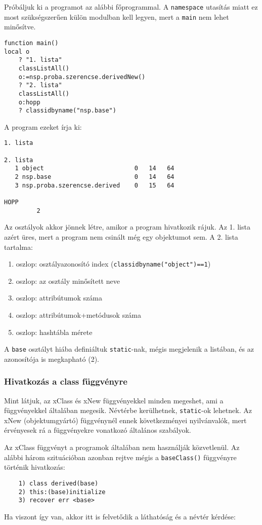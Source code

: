 Próbáljuk ki a programot az alábbi főprogrammal. A  \verb!namespace! 
utasítás miatt ez most szükségszerűen külön modulban kell legyen, mert a \verb!main!
nem lehet minősítve.
\begin{verbatim}
function main()
local o
    ? "1. lista"
    classListAll()
    o:=nsp.proba.szerencse.derivedNew()
    ? "2. lista"
    classListAll()
    o:hopp
    ? classidbyname("nsp.base")
\end{verbatim}
A program ezeket írja ki:
\begin{verbatim}
1. lista

2. lista
   1 object                         0   14   64
   2 nsp.base                       0   14   64
   3 nsp.proba.szerencse.derived    0   15   64

HOPP
         2
\end{verbatim}
Az osztályok akkor jönnek létre, amikor a program hivatkozik rájuk.
Az 1. lista azért üres, mert a program nem csinált még egy objektumot sem.
A 2. lista tartalma:
\begin{enumerate}
\item oszlop: osztályazonosító index (\verb!classidbyname("object")==1!)
\item oszlop: az osztály minősített neve
\item oszlop: attribútumok száma
\item oszlop: attribútumok+metódusok száma
\item oszlop: hashtábla mérete
\end{enumerate}
A \verb!base! osztályt hiába definiáltuk \verb!static!-nak, 
mégis megjelenik a listában, és az azonosítója is megkapható (2).


\subsubsection{Hivatkozás a class függvényre}

Mint látjuk, az xClass és xNew függvényekkel minden megeshet, 
ami a függvényekkel általában megesik. Névtérbe kerülhetnek, 
\verb!static!-ok lehetnek.
Az xNew (objektumgyártó) függvénynél ennek következményei
nyilvánvalók, mert érvényesek rá a függvényekre vonatkozó 
általános szabályok.

Az xClass függvényt a programok általában nem használják közvetlenül. 
Az alábbi három szituációban azonban rejtve mégis a \verb!baseClass()!
függvényre történik hivatkozás:
\begin{verbatim}
    1) class derived(base)
    2) this:(base)initialize
    3) recover err <base>
\end{verbatim}
Ha viszont így van, 
akkor itt is felvetődik a láthatóság és a névtér kérdése:

